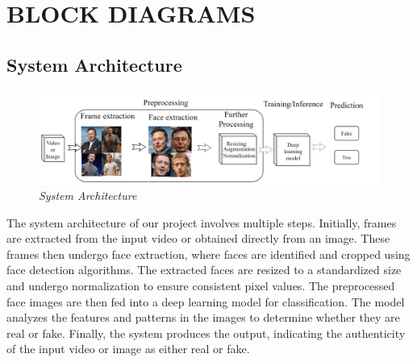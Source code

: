 \section{BLOCK DIAGRAMS}
\subsection{System Architecture}
\begin{figure}[h]
    \centering
    \includegraphics[width= 6.5in ]{img/systemachitecture.drawio.png}
    \caption{\textit{System Architecture}}

\end{figure}
\justify
The system architecture of our project involves multiple steps. Initially, frames are extracted from the input video or obtained directly from an image. These frames then undergo face extraction, where faces are identified and cropped using face detection algorithms. The extracted faces are resized to a standardized size and undergo normalization to ensure consistent pixel values. The preprocessed face images are then fed into a deep learning model for classification. The model analyzes the features and patterns in the images to determine whether they are real or fake. Finally, the system produces the output, indicating the authenticity of the input video or image as either real or fake.
